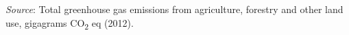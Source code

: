 \footnotebar
\textit{Source}: Total greenhouse gas emissions from agriculture, forestry and other land use, gigagrams CO\textsubscript{2} eq (2012). 

